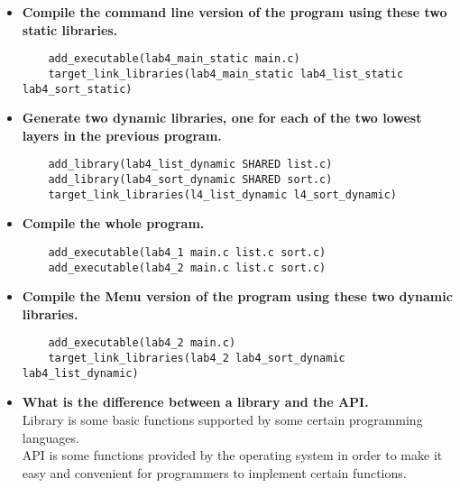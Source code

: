 \documentclass{article}
\begin{document}
\begin{spacing}{1.5}
\begin{itemize}
	\item \textbf{Compile the command line version of the program using these two static libraries.}
	\begin{lstlisting}
	add_executable(lab4_main_static main.c)
	target_link_libraries(lab4_main_static lab4_list_static lab4_sort_static)
	\end{lstlisting}
	\item\textbf{Generate two dynamic libraries, one for each of the two lowest layers in the previous program.}
	\begin{lstlisting}
	add_library(lab4_list_dynamic SHARED list.c)
	add_library(lab4_sort_dynamic SHARED sort.c)
	target_link_libraries(l4_list_dynamic l4_sort_dynamic)
	\end{lstlisting}
	\item\textbf{Compile the whole program.}
	\begin{lstlisting}
	add_executable(lab4_1 main.c list.c sort.c)
	add_executable(lab4_2 main.c list.c sort.c)
	\end{lstlisting}
	\item \textbf{Compile the Menu version of the program using these two dynamic libraries.}
	\begin{lstlisting}
	add_executable(lab4_2 main.c)
	target_link_libraries(lab4_2 lab4_sort_dynamic lab4_list_dynamic)
	\end{lstlisting}
	\item\textbf{What is the difference between a library and the API.}\\
	Library is some basic functions supported by some certain programming languages.\\
	API is some functions provided by the operating system in order to make it easy and convenient for programmers to implement certain functions.
\end{itemize}

\end{spacing}
\end{document}
